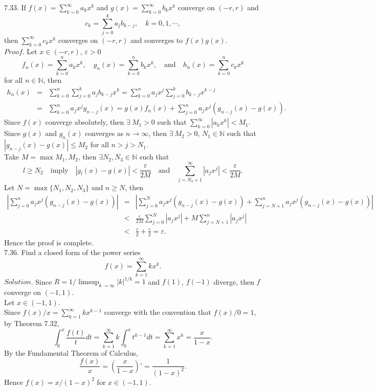 \documentclass[12pt]{book}
\begin{document}
\begin{CJK}{UTF8}{bsmi}
7.33. If $f(x) = \sum_{k=0}^\infty a_k x^k$ and $g(x) = \sum_{k=0}^\infty b_k x^k$ converge on $(-r, r)$ and
\[
    c_k = \sum_{j=0}^k a_j b_{k-j},\quad k = 0, 1, \cdots,
\]
then $\sum_{k=0}^\infty c_k x^k$ converges on $(-r, r)$ and converges to $f(x)g(x)$. \\
$Proof$. Let $x\in(-r, r)$, $\varepsilon>0$
\[
    f_n(x) = \sum_{k=0}^n a_k x^k,\quad
    g_n(x) = \sum_{k=0}^n b_k x^k,\quad\text{and}\quad
    h_n(x) = \sum_{k=0}^n c_k x^k
\]
for all $n\in\mathbb{N}$, then
\begin{eqnarray*}
h_n(x) 
    & = & \sum_{k=0}^n \sum_{j=0}^k a_j b_{k-j} x^k
    = \sum_{k=0}^n a_j x^j \sum_{j=0}^k b_{k-j} x^{k-j} \\
    & = & \sum_{k=0}^n a_j x^j g_{n-j}(x) 
    = g(x)f_n(x) + \sum_{j=0}^n a_jx^j (g_{n-j}(x)-g(x)).
\end{eqnarray*}
 Since $f(x)$ converge absolutely, then $\exists\ M_1>0$ such that $\sum_{k=0}^\infty |a_k x^k|<M_1$. \\
 Since $g(x)$ and $g_n(x)$ converges as $n\rightarrow\infty$, then $\exists\ M_2>0$, $N_1\in\mathbb{N}$ such that $|g_{n-j}(x)-g(x)|\le M_2$ for all $n>j>N_1$. \\
 Take $M=\max{M_1, M_2}$, then $\exists N_2, N_3\in\mathbb{N}$ such that
\[
    l\ge N_2
    \quad\text{imply}\quad
    |g_l(x)-g(x)| < \frac{\varepsilon}{2M}
    \quad\text{and}\quad
    \sum_{j=N_3+1}^\infty |a_j x^j|<\frac{\varepsilon}{2M}.
\]
Let $N=\max\{N_1, N_2, N_3\}$ and $n\ge N$, then
\begin{eqnarray*}
\left| \sum_{j=0}^n a_j x^j (g_{n-j}(x)-g(x)) \right|
    & = & \left| \sum_{j=0}^N a_j x^j (g_{n-j}(x)-g(x)) +
    \sum_{j=N+1}^n a_j x^j (g_{n-j}(x)-g(x))
    \right| \\
    & < & \frac{\varepsilon}{2M}\sum_{j=0}^N |a_j x^j| +
    M\sum_{j=N+1}^n |a_j x^j| \\
    & < & \frac{\varepsilon}{2} + \frac{\varepsilon}{2} = \varepsilon.
\end{eqnarray*}
Hence the proof is complete. \\

7.36. Find a closed form of the power series
\[
    f(x) = \sum_{k=1}^\infty k x^k.
\]
$Solution$. Since $R = 1/\limsup_{k\rightarrow\infty}|k|^{1/k} = 1$ and $f(1)$, $f(-1)$ diverge, then $f$ converge on $(-1, 1)$. \\
Let $x\in(-1, 1)$. \\
Since $f(x)/x = \sum_{k=1}^\infty k x^{k-1}$ converge with the convention that $f(x)/0 = 1$, by Theorem 7.32, 
\[
    \int_0^x \frac{f(t)}{t} dt
    = \sum_{k=1}^\infty k \int_0^x t^{k-1} dt
    = \sum_{k=1}^\infty x^k
    = \frac{x}{1-x}.
\]
By the Fundamental Theorem of Calculus, 
\[
    \frac{f(x)}{x}
    = \left( \frac{x}{1-x} \right)'
    = \frac{1}{(1-x)^2}.
\]
Hence $f(x) = x/(1-x)^2$ for $x\in(-1, 1)$. \\


\end{CJK}
\end{document}
